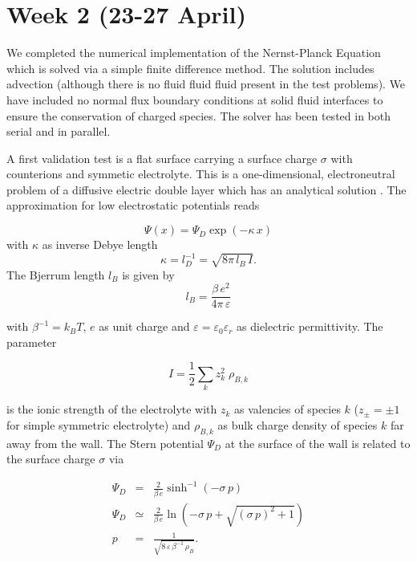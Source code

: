 \documentclass[aps,pre,preprint,groupedaddress]{revtex4-1}
\begin{document}
\section{Week 2 (23-27 April)}

We completed the numerical implementation of the Nernst-Planck
Equation which is solved via a simple finite difference method.
The solution includes advection (although there is no fluid
fluid fluid present in the test problems). We have included
no normal flux boundary conditions at solid fluid interfaces
to ensure the conservation of charged species. The solver
has been tested in both serial and in parallel.

A first validation test is a flat surface carrying a surface charge $\sigma$
with counterions and symmetic electrolyte. This is a one-dimensional, 
electroneutral problem of a diffusive electric double layer which has 
an analytical solution \cite{Lyklema}. 
The approximation for low electrostatic 
potentials reads

\begin{equation}\label{gouychapman}
\Psi(x) = \Psi_D \exp(-\kappa\, x)
\end{equation}
with $\kappa$ as inverse Debye length 
\begin{equation}
\kappa = l_D^{-1} = \sqrt{8\pi\, l_B \, I}.
\end{equation}
The Bjerrum length $l_B$ is given by 
\begin{equation}
l_B = \frac{\beta\,e^2}{4\pi\,\varepsilon}
\end{equation} 

with $\beta^{-1}=k_B T$, $e$ as unit charge and $\varepsilon=\varepsilon_0\varepsilon_r$ 
as dielectric permittivity.
The parameter 

\begin{equation}
I = \frac{1}{2}\sum_k z_k^2\; \rho_{B,k}
\end{equation} 

is the ionic strength 
of the electrolyte with $z_k$ as valencies of species $k$
($z_\pm=\pm 1$ for simple symmetric electrolyte) and $\rho_{B,k}$ as 
bulk charge density of species $k$ far away from the wall.
The Stern potential $\Psi_D$ at the surface of the wall is related 
to the surface charge $\sigma$ via

\begin{eqnarray}
\Psi_D&=&\frac{2}{\beta \,e} \sinh^{-1}\left(-\sigma\,p\right)\\
\Psi_D&\simeq&\frac{2}{\beta \,e} \ln\left(-\sigma \, p + \sqrt{(\sigma\,p)^2+1}\right)\\
p &=& \frac{1}{\sqrt{8\, \varepsilon\, \beta^{-1} \,\rho_B}}.
\end{eqnarray}
\end{document}
